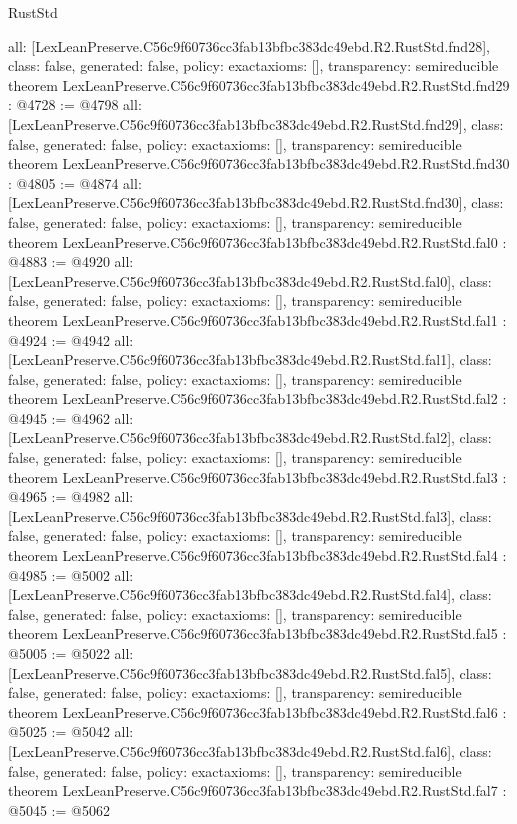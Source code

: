 \begin{lexlean}{RustStd}
\begin{coremodule}
{  all: [LexLeanPreserve.C56c9f60736cc3fab13bfbc383dc49ebd.R2.RustStd.fnd28],
  class: false,
  generated: false,
  policy: exact{axioms: []},
  transparency: semireducible
}
theorem LexLeanPreserve.C56c9f60736cc3fab13bfbc383dc49ebd.R2.RustStd.fnd29 : @4728 := @4798 {
  all: [LexLeanPreserve.C56c9f60736cc3fab13bfbc383dc49ebd.R2.RustStd.fnd29],
  class: false,
  generated: false,
  policy: exact{axioms: []},
  transparency: semireducible
}
theorem LexLeanPreserve.C56c9f60736cc3fab13bfbc383dc49ebd.R2.RustStd.fnd30 : @4805 := @4874 {
  all: [LexLeanPreserve.C56c9f60736cc3fab13bfbc383dc49ebd.R2.RustStd.fnd30],
  class: false,
  generated: false,
  policy: exact{axioms: []},
  transparency: semireducible
}
theorem LexLeanPreserve.C56c9f60736cc3fab13bfbc383dc49ebd.R2.RustStd.fal0 : @4883 := @4920 {
  all: [LexLeanPreserve.C56c9f60736cc3fab13bfbc383dc49ebd.R2.RustStd.fal0],
  class: false,
  generated: false,
  policy: exact{axioms: []},
  transparency: semireducible
}
theorem LexLeanPreserve.C56c9f60736cc3fab13bfbc383dc49ebd.R2.RustStd.fal1 : @4924 := @4942 {
  all: [LexLeanPreserve.C56c9f60736cc3fab13bfbc383dc49ebd.R2.RustStd.fal1],
  class: false,
  generated: false,
  policy: exact{axioms: []},
  transparency: semireducible
}
theorem LexLeanPreserve.C56c9f60736cc3fab13bfbc383dc49ebd.R2.RustStd.fal2 : @4945 := @4962 {
  all: [LexLeanPreserve.C56c9f60736cc3fab13bfbc383dc49ebd.R2.RustStd.fal2],
  class: false,
  generated: false,
  policy: exact{axioms: []},
  transparency: semireducible
}
theorem LexLeanPreserve.C56c9f60736cc3fab13bfbc383dc49ebd.R2.RustStd.fal3 : @4965 := @4982 {
  all: [LexLeanPreserve.C56c9f60736cc3fab13bfbc383dc49ebd.R2.RustStd.fal3],
  class: false,
  generated: false,
  policy: exact{axioms: []},
  transparency: semireducible
}
theorem LexLeanPreserve.C56c9f60736cc3fab13bfbc383dc49ebd.R2.RustStd.fal4 : @4985 := @5002 {
  all: [LexLeanPreserve.C56c9f60736cc3fab13bfbc383dc49ebd.R2.RustStd.fal4],
  class: false,
  generated: false,
  policy: exact{axioms: []},
  transparency: semireducible
}
theorem LexLeanPreserve.C56c9f60736cc3fab13bfbc383dc49ebd.R2.RustStd.fal5 : @5005 := @5022 {
  all: [LexLeanPreserve.C56c9f60736cc3fab13bfbc383dc49ebd.R2.RustStd.fal5],
  class: false,
  generated: false,
  policy: exact{axioms: []},
  transparency: semireducible
}
theorem LexLeanPreserve.C56c9f60736cc3fab13bfbc383dc49ebd.R2.RustStd.fal6 : @5025 := @5042 {
  all: [LexLeanPreserve.C56c9f60736cc3fab13bfbc383dc49ebd.R2.RustStd.fal6],
  class: false,
  generated: false,
  policy: exact{axioms: []},
  transparency: semireducible
}
theorem LexLeanPreserve.C56c9f60736cc3fab13bfbc383dc49ebd.R2.RustStd.fal7 : @5045 := @5062 {
}
\end{coremodule}
\end{lexlean}
